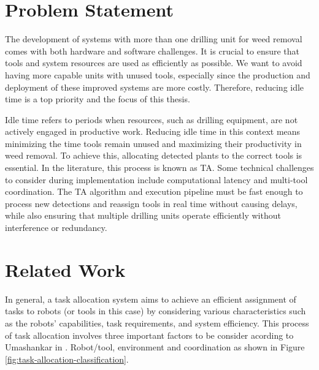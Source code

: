 \section{Problem Statement}

The development of systems with more than one drilling unit for weed removal comes with both hardware and software challenges. It is crucial to ensure that tools and system resources are used as efficiently as possible. We want to avoid having more capable units with unused tools, especially since the production and deployment of these improved systems are more costly. Therefore, reducing idle time is a top priority and the focus of this thesis.


Idle time refers to periods when resources, such as drilling equipment, are not actively engaged in productive work. Reducing idle time in this context means minimizing the time tools remain unused and maximizing their productivity in weed removal. To achieve this, allocating detected plants to the correct tools is essential. In the literature, this process is known as \ac{TA}. Some technical challenges to consider during implementation include computational latency and multi-tool coordination. The \ac{TA} algorithm and execution pipeline must be fast enough to process new detections and reassign tools in real time without causing delays, while also ensuring that multiple drilling units operate efficiently without interference or redundancy.

\section{Related Work}

In general, a task allocation system aims to achieve an efficient assignment of tasks to robots (or tools in this case) by considering various characteristics such as the robots' capabilities, task requirements, and system efficiency. This process of task allocation involves three important factors to be consider acording to Umashankar in \cite{10.1145/3700591}. Robot/tool, environment and coordination as shown in Figure \ref{fig:task-allocation-classification}. 


